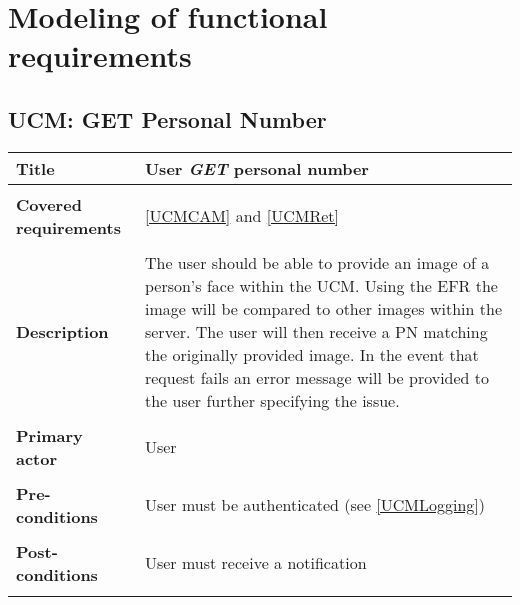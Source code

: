 \documentclass[a4paper,11pt]{article}
\begin{document}
\newpage
\section{Modeling of functional requirements}


\subsection{UCM: GET Personal Number}

\begin{tabular}{|p{3.5cm}|p{11.5cm}|} \hline
    \textbf{Title} &  User \emph{GET} personal number 
        
    \\ \hline \rowcolor{Gray} & \\ \hline
        
    \textbf{Covered requirements} &  \ref{UCMCAM} and \ref{UCMRet}
        
    \\ \hline \rowcolor{Gray} & \\ \hline
        
    \textbf{Description} &  The user should be able to provide an image of a person's face within the UCM. Using the EFR the image will be compared to other images within the server. The user will then receive a PN matching the originally provided image. In the event that request fails an error message will be provided to the user further specifying the issue.
        
    \\ \hline \rowcolor{Gray} & \\ \hline
        
    \textbf{Primary actor} & User  
        
    \\ \hline \rowcolor{Gray} & \\ \hline 
          
    \textbf{Pre-conditions} &   User must be authenticated (see \ref{UCMLogging})
        
    \\ \hline \rowcolor{Gray} & \\ \hline
         
    \textbf{Post-conditions} &   User must receive a notification
        
    \\ \hline \rowcolor{Gray} & \\ \hline 
         

\end{tabular}
\end{document}
